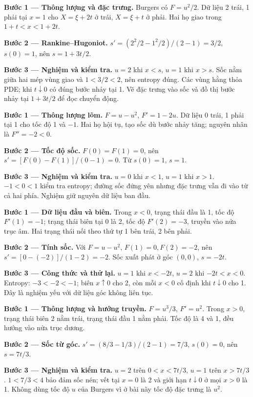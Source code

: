 \textbf{Bước 1 — Thông lượng và đặc trưng.} Burgers có $F=u^2/2$. Dữ liệu 2 trái, 1 phải tại $x=1$ cho $X=\xi+2t$ ở trái, $X=\xi+t$ ở phải. Hai họ giao trong $1+t<x<1+2t$.

\textbf{Bước 2 — Rankine–Hugoniot.} $s'=(2^2/2-1^2/2)/(2-1)=3/2$, $s(0)=1$, nên $s=1+3t/2$.

\textbf{Bước 3 — Nghiệm và kiểm tra.} $u=2$ khi $x<s$, $u=1$ khi $x>s$. Sốc nằm giữa hai mép vùng giao và $1<3/2<2$, nên entropy đúng. Các vùng hằng thỏa PDE; khi $t\downarrow0$ có đúng bước nhảy tại 1. Vẽ đặc trưng vào sốc và đồ thị bước nhảy tại $1+3t/2$ để đọc chuyển động.

\textbf{Bước 1 — Thông lượng lõm.} $F=u-u^2$, $F'=1-2u$. Dữ liệu 0 trái, 1 phải tại 1 cho tốc độ 1 và $-1$. Hai họ hội tụ, tạo sốc dù bước nhảy tăng; nguyên nhân là $F''=-2<0$.

\textbf{Bước 2 — Tốc độ sốc.} $F(0)=F(1)=0$, nên $s'=[F(0)-F(1)]/(0-1)=0$. Từ $s(0)=1$, $s=1$.

\textbf{Bước 3 — Nghiệm và kiểm tra.} $u=0$ khi $x<1$, $u=1$ khi $x>1$. $-1<0<1$ kiểm tra entropy; đường sốc đứng yên nhưng đặc trưng vẫn đi vào từ cả hai phía. Nghiệm giữ nguyên dữ liệu ban đầu.

\textbf{Bước 1 — Dữ liệu đầu và biên.} Trong $x<0$, trạng thái đầu là 1, tốc độ $F'(1)=-1$; trạng thái biên tại 0 là 2, tốc độ $F'(2)=-3$, truyền vào nửa trục âm. Hai trạng thái nối theo thứ tự 1 bên trái, 2 bên phải.

\textbf{Bước 2 — Tính sốc.} Với $F=u-u^2$, $F(1)=0,F(2)=-2$, nên $s'=[0-(-2)]/(1-2)=-2$. Sốc xuất phát ở góc $(0,0)$, $s=-2t$.

\textbf{Bước 3 — Công thức và thử lại.} $u=1$ khi $x<-2t$, $u=2$ khi $-2t<x<0$. Entropy: $-3<-2<-1$; biên $x\uparrow0$ cho 2, còn mỗi $x<0$ cố định khi $t\downarrow0$ cho 1. Đây là nghiệm yếu với dữ liệu góc không liên tục.

\textbf{Bước 1 — Thông lượng và hướng truyền.} $F=u^3/3$, $F'=u^2$. Trong $x>0$, trạng thái biên 2 nằm trái, trạng thái đầu 1 nằm phải. Tốc độ là 4 và 1, đều hướng vào nửa trục dương.

\textbf{Bước 2 — Sốc từ góc.} $s'=(8/3-1/3)/(2-1)=7/3$, $s(0)=0$, nên $s=7t/3$.

\textbf{Bước 3 — Nghiệm và kiểm tra.} $u=2$ trên $0<x<7t/3$, $u=1$ trên $x>7t/3$. $1<7/3<4$ bảo đảm sốc nén; vết tại $x=0$ là 2 và giới hạn $t\downarrow0$ ở mọi $x>0$ là 1. Không dùng tốc độ $u$ của Burgers vì ở bài này tốc độ đặc trưng là $u^2$.

